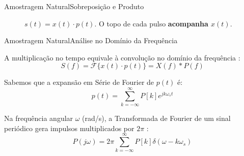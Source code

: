 \begin{frame}{Amostragem Natural}{Sobreposição e Produto}
\begin{minipage}[c]{0.48\textwidth}
\begin{figure}
			\caption{$s(t)=x(t)\cdot p(t)$. O topo de cada pulso
				\textbf{acompanha $x(t)$}.}
			\label{fig: produto_xt_pt_natural}
		\end{figure}
		
	\end{minipage}
	
\end{frame}

\begin{frame}{Amostragem Natural}{Análise no Domínio da Frequência}
	
	A multiplicação no tempo equivale à convolução no domínio da frequência  \cite{oppenheim1997signals}:
	\begin{equation}
		S(f) = \mathcal{F}\{x(t) \cdot p(t)\} = X(f) * P(f)
		\label{eq: definicao_convolucao_frequencia_natural}
	\end{equation}
	
	Sabemos que a expansão em Série de Fourier de $p(t)$ é: 
	\begin{equation*}
		p(t) = \sum_{k=-\infty}^{\infty} P[k] e^{j k \omega_s t}
	\end{equation*}
	
	Na frequência angular $\omega$ (rad/s), a Transformada de Fourier de um sinal periódico gera impulsos multiplicados por $2\pi$  \cite{oppenheim1997signals}:
	\begin{equation*}
		P(j\omega) = 2\pi \sum_{k=-\infty}^{\infty} P[k] \delta(\omega - k\omega_s)
	\end{equation*}
	
\end{frame}

